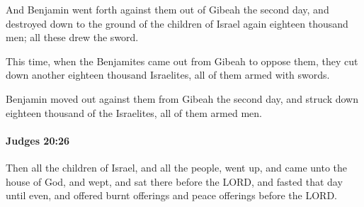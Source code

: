 			\begin{versebox}
					\item[BHS] 
					\item[ASV] And Benjamin went forth against them out of Gibeah the second day, and destroyed down to the ground of the children of Israel again eighteen thousand men; all these drew the sword.
					\item[NIV] This time, when the Benjamites came out from Gibeah to oppose them, they cut down another eighteen thousand Israelites, all of them armed with swords.
					\item[NRSV] Benjamin moved out against them from Gibeah the second day, and struck down eighteen thousand of the Israelites, all of them armed men.
			\end{versebox}

		\paragraph{Judges 20:26} %
			\label{JUDGES-20-26}

			Then all the children of Israel, and all the people, went up, and came unto the house of God, and wept, and sat there before the LORD, and fasted that day until even, and offered burnt offerings and peace offerings before the LORD.

